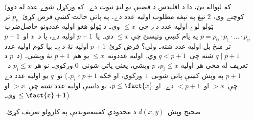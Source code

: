 \documentclass[../../../include/open-logic-section]{subfiles}
\begin{document}
(که لېواله يئ، دا د اقليدس د قضيې يو لنډ ثبوت دے۔ که ورکړل شوے عدد له دوو کوچنے وي، 2 نېغ په نېغه مطلوب اوليه عدد دے۔ په پاتې حالت کښې فرض کړئ~$p_n$ تر ټولو لوے اوليه عدد دے چې~$\le x$ وي۔ د ټولو هغو اوليه عددونو حاصل‌ضرب $p = p_0\cdot p_1 \cdot \dots \cdot p_n$ په پام کښې ونيسئ چې $\le x$ دي۔ يا~$p+1$ اوليه دے، يا د~$x$ او~$p+1$ تر منځ بل اوليه عدد شته۔ ولې؟ فرض کړئ~$p+1$ اوليه نۀ دے۔ بيا کوم اوليه عدد $q \mid p+1$ شته چې~$q < p+1$ وي۔ اوليه عددونه~$\le x$ يو هم~$p+1$ نۀ وېشي۔ (د~$p$ د تعريف له مخې هر اوليه $p_i \le x$، $p$ وېشي، يعنې پاتې شونی~$0$ ورکوي۔ نو هر $p_i \le x$ د~$p+1$ په وېش کښې پاتې شونی~$1$ ورکوي، او ځکه $p_i \nmid p+1$۔) نو~$q$ يو اوليه عدد دے چې~$>x$ او~$<p+1$ دے۔ او $p \le \fact{x}$، نو داسې اوليه عدد شته چې~$>x$ او $\le \fact{x}+1$ وي۔)

\begin{prob}
صحيح وېش~$d(x, y)$ د محدودې کمينه‌موندنې په کارولو تعريف کړئ۔
\end{prob}
\end{document}
